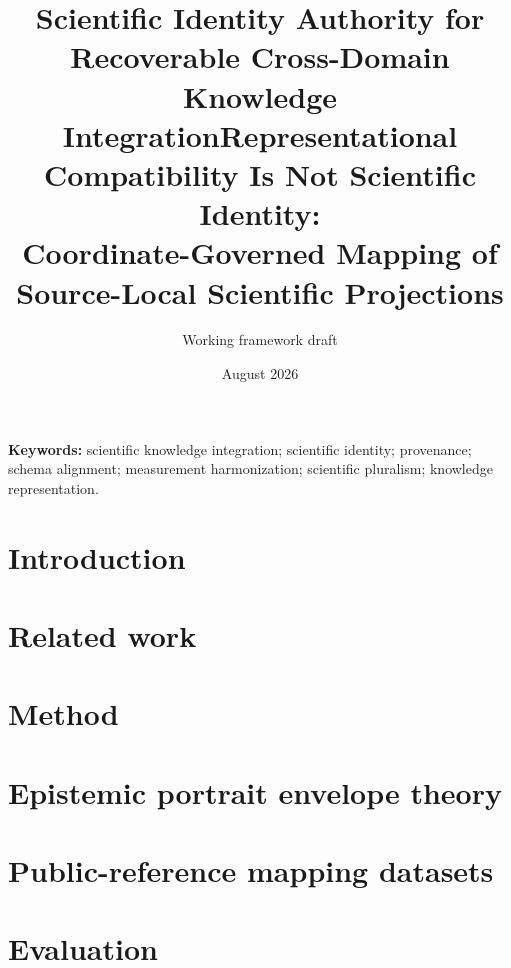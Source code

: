\documentclass[11pt]{article}
\title{Scientific Identity Authority for Recoverable Cross-Domain Knowledge Integration}
\title{Representational Compatibility Is Not Scientific Identity:\\
Coordinate-Governed Mapping of Source-Local Scientific Projections}
\author{Working framework draft}
\date{August 2026}
\theoremstyle{definition}
\begin{document}
\maketitle

\begin{abstract}

\end{abstract}

\noindent\textbf{Keywords:} scientific knowledge integration; scientific identity; provenance; schema alignment; measurement harmonization; scientific pluralism; knowledge representation.

\section{Introduction}
\label{sec:introduction}


\section{Related work}
\label{sec:related}


\section{Method}
\label{sec:method}



\section{Epistemic portrait envelope theory}
\label{sec:envelope}


\section{Public-reference mapping datasets}
\label{sec:dataset}


\section{Evaluation}
\label{sec:eval}













\end{document}
